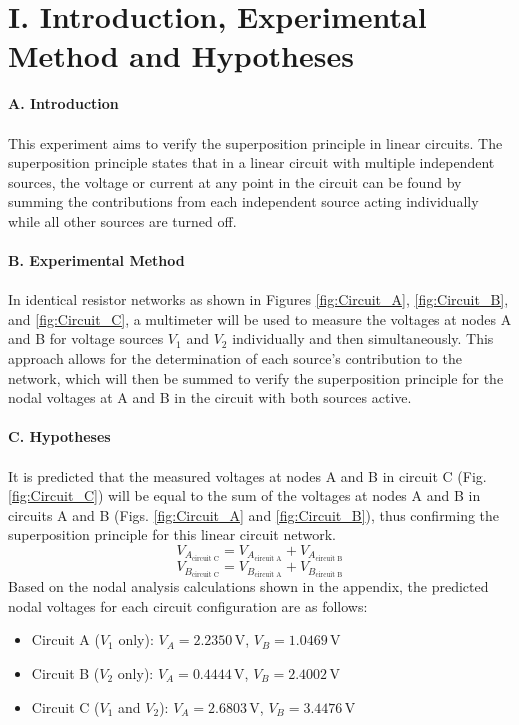 \documentclass[12pt]{article}
\begin{document}
\section*{I. Introduction, Experimental Method and Hypotheses}
\textbf{A. Introduction}\\\\
This experiment aims to verify the superposition principle in linear circuits. The superposition principle states that in a linear circuit with multiple independent sources, the voltage or current at any point in the circuit can be found by summing the contributions from each independent source acting individually while all other sources are turned off. \\\\
\textbf{B. Experimental Method}\\\\
In identical resistor networks as shown in Figures \ref{fig:Circuit_A}, \ref{fig:Circuit_B}, and \ref{fig:Circuit_C}, a multimeter will be used to measure the voltages at nodes A and B for voltage sources $V_1$ and $V_2$ individually and then simultaneously. This approach allows for the determination of each source's contribution to the network, which will then be summed to verify the superposition principle for the nodal voltages at A and B in the circuit with both sources active.\\\\
\textbf{C. Hypotheses}\\\\
It is predicted that the measured voltages at nodes A and B in circuit C (Fig. \ref{fig:Circuit_C}) will be equal to the sum of the voltages at nodes A and B in circuits A and B (Figs. \ref{fig:Circuit_A} and \ref{fig:Circuit_B}), thus confirming the superposition principle for this linear circuit network.
\[V_{A_\text{circuit C}} = V_{A_\text{circuit A}} + V_{A_\text{circuit B}}\]
\[V_{B_\text{circuit C}} = V_{B_\text{circuit A}} + V_{B_\text{circuit B}}\]
Based on the nodal analysis calculations shown in the appendix, the predicted nodal voltages for each circuit configuration are as follows:
\begin{itemize}
    \item Circuit A ($V_1$ only): $V_A = 2.2350\,\text{V}$, $V_B = 1.0469\,\text{V}$
    \item Circuit B ($V_2$ only): $V_A = 0.4444\,\text{V}$, $V_B = 2.4002\,\text{V}$
    \item Circuit C ($V_1$ and $V_2$): $V_A = 2.6803\,\text{V}$, $V_B = 3.4476\,\text{V}$
\end{itemize}
\end{document}
